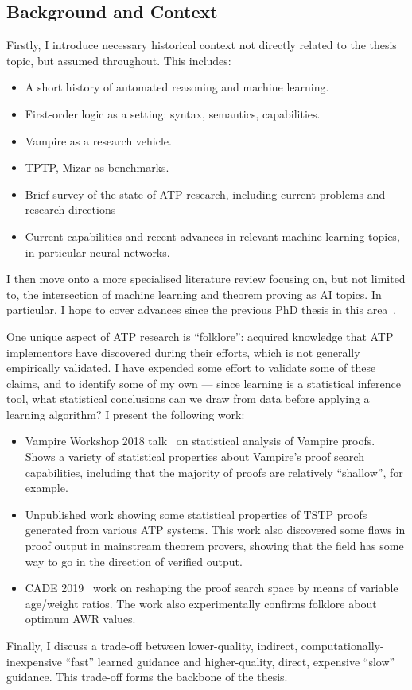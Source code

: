 \documentclass[a4paper]{article}
\begin{document}
\subsection{Background and Context}
\label{sec:background}
Firstly, I introduce necessary historical context not directly related to the thesis topic, but assumed throughout.
This includes:
\begin{itemize}
	\item A short history of automated reasoning and machine learning.
	\item First-order logic as a setting: syntax, semantics, capabilities.
	\item Vampire as a research vehicle.
	\item TPTP, Mizar as benchmarks.
	\item Brief survey of the state of ATP research, including current problems and research directions
	\item Current capabilities and recent advances in relevant machine learning topics, in particular neural networks.
\end{itemize}
I then move onto a more specialised literature review focusing on, but not limited to, the intersection of machine learning and theorem proving as AI topics.
In particular, I hope to cover advances since the previous PhD thesis in this area~\cite{bridge}.

One unique aspect of ATP research is ``folklore'': acquired knowledge that ATP implementors have discovered during their efforts, which is not generally empirically validated.
I have expended some effort to validate some of these claims, and to identify some of my own --- since learning is a statistical inference tool, what statistical conclusions can we draw from data before applying a learning algorithm?
I present the following work:
\begin{itemize}
	\item Vampire Workshop 2018 talk~\cite{vampire2018} on statistical analysis of Vampire proofs. Shows a variety of statistical properties about Vampire's proof search capabilities, including that the majority of proofs are relatively ``shallow'', for example.
	\item Unpublished work showing some statistical properties of TSTP proofs generated from various ATP systems. This work also discovered some flaws in proof output in mainstream theorem provers, showing that the field has some way to go in the direction of verified output.
	\item CADE 2019~\cite{cade2019} work on reshaping the proof search space by means of variable age/weight ratios. The work also experimentally confirms folklore about optimum AWR values.
\end{itemize}
Finally, I discuss a trade-off between lower-quality, indirect, computationally-inexpensive ``fast'' learned guidance and higher-quality, direct, expensive ``slow'' guidance.
This trade-off forms the backbone of the thesis.
\end{document}
